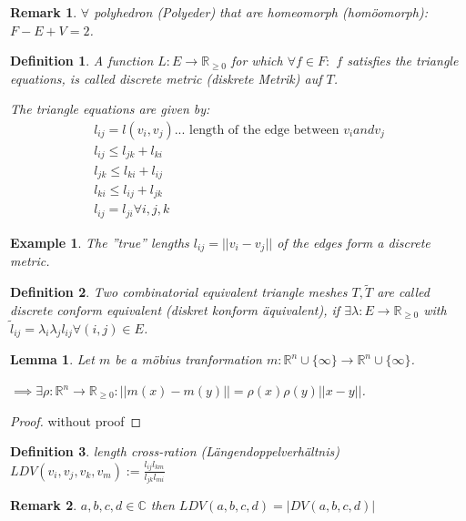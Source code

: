 \documentclass[]{article}
\newtheorem{lemma}{Lemma}
\newtheorem{definition}{Definition}
\newtheorem{example}{Example}
\newtheorem{remark}{Remark}
\begin{document}
\begin{remark}
	$\forall$ polyhedron (Polyeder) that are homeomorph (homöomorph): $F-E+V=2$.
\end{remark}

\begin{definition}
	A function $L:E \rightarrow \mathbb{R}_{\geq 0}$ for which $\forall f \in F:$ $f$ satisfies the triangle equations, is called discrete metric (diskrete Metrik) auf $T$.
	
	The triangle equations are given by:
	\begin{align*}
		l_{ij} = l(v_i, v_j) \text{... length of the edge between } v_i and v_j\\
		l_{ij} \leq l_{jk} + l_{ki}\\
		l_{jk} \leq l_{ki} + l_{ij}\\
		l_{ki} \leq l_{ij} + l_{jk}\\
		l_{ij} = l_{ji} \forall i, j, k
	\end{align*}
\end{definition}

\begin{example}
	The ''true'' lengths $l_{ij} = ||v_i - v_j||$ of the edges form a discrete metric.
\end{example}

\begin{definition}
	Two combinatorial equivalent triangle meshes $T, \tilde{T}$ are called discrete conform equivalent (diskret konform äquivalent), if $\exists \lambda: E \rightarrow \mathbb{R}_{\geq 0}$ with $\tilde{l}_{ij} = \lambda_i \lambda_j l_{ij} \forall (i,j) \in E$.
\end{definition}

\begin{lemma}
	Let $m$ be a möbius tranformation $m:\mathbb{R}^n \cup \{\infty\} \rightarrow \mathbb{R}^n \cup \{\infty\}$.
	
	$\implies \exists \rho:\mathbb{R}^n \rightarrow \mathbb{R}_{\geq 0}: ||m(x)-m(y)|| = \rho(x) \rho(y) ||x-y||$.
\end{lemma}

\begin{proof}
	without proof
\end{proof}

\begin{definition}
	length cross-ration (Längendoppelverhältnis) $LDV(v_i, v_j, v_k, v_m) := \frac{l_{ij}l_{km}}{l_{jk}l_{mi}}$
\end{definition}

\begin{remark}
	$a,b,c,d \in \mathbb{C}$ then $LDV(a,b,c,d) = |DV(a,b,c,d)|$
\end{remark}
\end{document}
